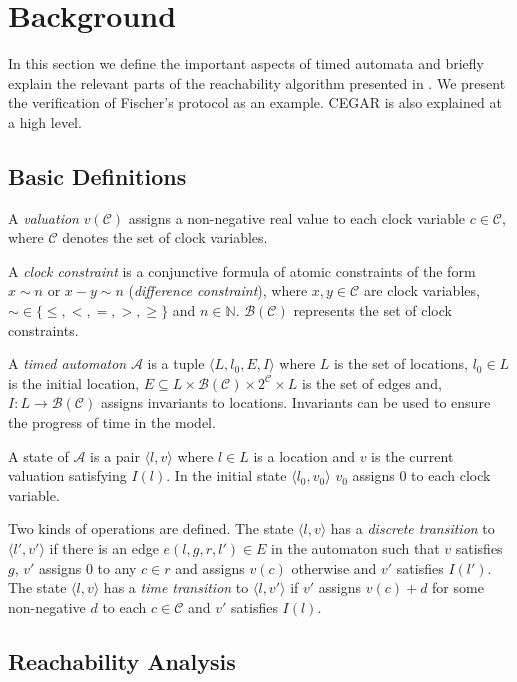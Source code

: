\chapter{Background}
\label{chap:background}

In this section we define the important aspects of timed automata and briefly
explain the relevant parts of the reachability algorithm presented in
. We present the verification of Fischer's protocol as
an example. CEGAR is also explained at a high level.


\section{Basic Definitions}
A \emph{valuation} $v(\mathcal{C})$ assigns a non-negative real value
to each clock variable $c \in \mathcal{C}$, where $\mathcal{C}$ denotes the set of clock
variables.

A \emph{clock constraint} is a conjunctive formula of atomic
constraints of the form $x \sim n$ or $x - y \sim n$ (\emph{difference
	constraint}), where $x,y \in \mathcal{C}$ are clock variables, $\sim \in
\{\leq,<,=,>,\geq\}$ and \hbox{$n \in \mathbb{N}$}. $\mathcal{B}(\mathcal{C})$ represents the set of clock
constraints.

A \emph{timed automaton} $\mathcal{A}$ is a tuple $\langle L, l_0,
E, I\rangle$ where
$L$ is the set of locations,
$l_0 \in L$ is the initial location,
$E \subseteq L \times \mathcal{B}(\mathcal{C}) \times 2^\mathcal{C} \times L$
is the set of edges and,
$I: L \to \mathcal{B}(\mathcal{C})$ assigns invariants to locations.  Invariants can be used to ensure the progress of time in the model.


A state of $\mathcal{A}$ is a pair $\langle l,v \rangle$ where $l \in L$ is a
location and $v$ is the current valuation satisfying $I(l)$. In the initial
state $\langle l_0,v_0 \rangle$ $v_0$ assigns 0 to each clock variable.

Two kinds of operations are defined. The state $\langle l,v \rangle$ has a
\emph{discrete transition} to $\langle l',v' \rangle$  if there is an
edge $e(l,g,r,l') \in E$ in the automaton such that $v$ satisfies $g$, $v'$ assigns 0 to any $c \in
r$ and assigns $v(c)$ otherwise and $v'$ satisfies $I(l')$. The state $\langle
l,v \rangle$ has a \emph{time transition} to $\langle l,v' \rangle$ if $v'$
assigns $v(c)+d$ for some non-negative $d$ to each $c \in \mathcal{C}$ and $v'$
satisfies $I(l)$. 


\section{Reachability Analysis} \label{sec:reach}  

